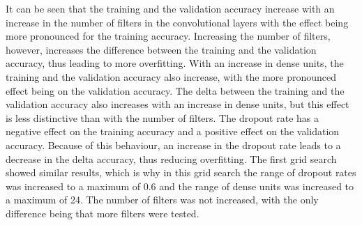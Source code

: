 It can be seen that the training and the validation accuracy increase with an increase in the number of filters in the convolutional layers with the effect being more pronounced for the training accuracy.
Increasing the number of filters, however, increases the difference between the training and the validation accuracy, thus leading to more overfitting.
With an increase in dense units, the training and the validation accuracy also increase, with the more pronounced effect being on the validation accuracy.
The delta between the training and the validation accuracy also increases with an increase in dense units, but this effect is less distinctive than with the number of filters.
The dropout rate has a negative effect on the training accuracy and a positive effect on the validation accuracy.
Because of this behaviour, an increase in the dropout rate leads to a decrease in the delta accuracy, thus reducing overfitting.
The first grid search showed similar results, which is why in this grid search the range of dropout rates was increased to a maximum of 0.6 and the range of dense units was increased to a maximum of 24.
The number of filters was not increased, with the only difference being that more filters were tested. %

